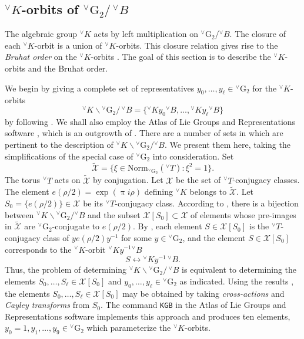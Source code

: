 \documentclass[a4paper, 11pt]{article}
\begin{document}
\subsection{${^\vee}K$-orbits of
  ${^\vee}\mathrm{G}_{2}/ \,{^\vee}B$}
\label{Korbits}

The algebraic group ${^\vee}K$ acts by left multiplication on
${^\vee}\mathrm{G}_{2}/ {^\vee}B$.  The closure of each
${^\vee}K$-orbit is a union of ${^\vee}K$-orbits. 
 This closure
relation gives rise to the \emph{Bruhat order} on the
${^\vee}K$-orbits \cite{RS90}. The
goal of this section is to  describe the ${^\vee}K$-orbits and the
Bruhat order.

We begin by giving a complete set of representatives
$y_{0}, \ldots, y_{\ell} \in {^\vee}\mathrm{G}_{2}$ for
the ${^\vee}K$-orbits 
$${^\vee}K \backslash {^\vee}\mathrm{G}_{2} / \,{^\vee}B  = \{
{^\vee}K y_{0}  {^\vee}B, \ldots ,  {^\vee}K
y_{\ell}  {^\vee}B\}$$ 
by following \cite{Adams-Fokko}.
We shall also employ the Atlas of Lie Groups and Representations
software \cite{atlas}, which is an outgrowth of  \cite{Adams-Fokko}.  
There are a number of sets in \cite{Adams-Fokko} which are pertinent
to the description of  ${^\vee}K \backslash {^\vee}\mathrm{G}_{2} /
{^\vee}B$.  We present them here, taking the simplifications of the
special case of ${^\vee}\mathrm{G}_{2}$ into consideration.  Set
$$\widetilde{\mathcal{X}} = \{ \xi \in
\mathrm{Norm}_{{^\vee}\mathrm{G}_{2}} ({^\vee}T) : \xi^{2} = 1\}.$$
The torus ${^\vee}T$ acts on $\widetilde{\mathcal{X}}$ by conjugation.
Let $\mathcal{X}$ be the set of ${^\vee}T$-conjugacy classes.  The
element  $e(\rho/2) = \exp(\uppi i \rho)$ defining ${^\vee}K$ belongs to
$\widetilde{\mathcal{X}}$.  Let $S_{0} = \{e(\rho/2)\} 
\in \mathcal{X}$ be its 
${^\vee}T$-conjugacy class.  
According to \cite[(9.8)]{Adams-Fokko}, there is a bijection between
${^\vee}K \backslash {^\vee}\mathrm{G}_{2} / {^\vee}B$ and the subset
$\mathcal{X}[S_{0}] \subset \mathcal{X}$ of elements whose pre-images in
$\widetilde{\mathcal{X}}$ are ${^\vee}\mathrm{G}_{2}$-conjugate 
to $e(\rho/2)$.  By \cite[(8.1), (9.1)]{Adams-Fokko}, each element $S
\in \mathcal{X}[S_{0}]$ is the  
 ${^\vee}T$-conjugacy class of $y e(\rho/2) y^{-1}$ for
some $y \in {^\vee}\mathrm{G}_{2}$, and the element $S \in
\mathcal{X}[S_{0}]$ corresponds to the ${^\vee}K$-orbit ${^\vee}K
y^{-1} {^\vee}B$ 
$$S \longleftrightarrow {^\vee}K y^{-1} \, {^\vee}B.$$
Thus, the problem of determining ${^\vee}K \backslash
{^\vee}\mathrm{G}_{2} / \,{^\vee}B$ is equivalent to determining the
elements $S_{0}, \ldots, S_{\ell} \in \mathcal{X}[S_{0}]$ and  $y_{0},
\ldots ,y_{\ell} \in {^\vee}\mathrm{G}_{2}$ as indicated.  Using
the results \cite[Proposition 11.2, Lemma 14.2 and Lemma
  14.11]{Adams-Fokko},  the elements $S_{0},
\ldots ,S_{\ell} \in  \mathcal{X}[S_{0}]$ may be obtained by
taking \emph{cross-actions} \cite[(9.11  f)]{Adams-Fokko} and
\emph{Cayley transforms} \cite[Definition 14.1]{Adams-Fokko}
from $S_{0}$.  The
command \texttt{KGB} in the Atlas of Lie Groups and Representations
software implements  this approach and produces ten elements,
$y_{0} = 1, y_{1}, \ldots , y_{9} \in
{^\vee}\mathrm{G}_{2}$ which parameterize the  ${^\vee}K$-orbits.
\end{document}
